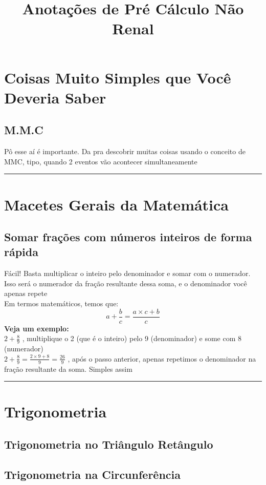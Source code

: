 \documentclass{article}
\title{Anotações de Pré Cálculo Não Renal}
\begin{document}
\maketitle

\section{Coisas Muito Simples que Você Deveria Saber}
\subsection{M.M.C}
Pô esse aí é importante. Da pra descobrir muitas coisas usando o conceito de MMC, tipo, quando 2 eventos vão acontecer simultaneamente

\vspace{15pt}
\hrule

\section{Macetes Gerais da Matemática}
\subsection{Somar frações com números inteiros de forma rápida}
Fácil! Basta multiplicar o inteiro pelo denominador e somar com o numerador. Isso será o numerador da fração resultante dessa soma, e o denominador você apenas repete\\[10pt]
Em termos matemáticos, temos que: 
\[
a + \frac{b}{c} = \frac{a\times c + b}{c}
\]
\textbf{Veja um exemplo:}\\[10pt]
$2 + \frac{8}{9}$ , multiplique o 2 (que é o inteiro) pelo 9 (denominador) e some com 8 (numerador)\\[10pt]
$2 + \frac{8}{9} = \frac{2 \times 9 + 8}{9} = \frac{26}{9}$ , após o passo anterior, apenas repetimos o denominador na fração resultante da soma. Simples assim
\vspace{15pt}
\hrule

\section{Trigonometria}

\subsection{Trigonometria no Triângulo Retângulo}

\subsection{Trigonometria na Circunferência}
\end{document}
